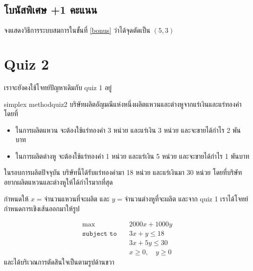 \subsection*{โบนัสพิเศษ +1 คะแนน}
จงแสดงวิธีการระบบสมการในขั้นที่ \ref{bonus} ว่าได้จุดตัดเป็น $(5,3)$

\newpage
\section*{Quiz 2}
เราจะยังคงใช้โจทย์ปัญหาเดิมกับ quiz 1 อยู่
\begin{exercise}{simplex method}{quiz2}
    บริษัทผลิตอัญมณีแห่งหนึ่งผลิตแหวนและต่างหูจากแร่เงินและแร่ทองคำ โดยที่
    \begin{itemize}
        \item ในการผลิตแหวน จะต้องใช้แร่ทองคำ 3 หน่วย และแร่เงิน 3 หน่วย และจะขายได้กำไร 2 พันบาท
        \item ในการผลิตต่างหู จะต้องใช้แร่ทองคำ 1 หน่วย และแร่เงิน 5 หน่วย และจะขายได้กำไร 1 พันบาท
    \end{itemize}
    ในรอบการผลิตปัจจุบัน บริษัทนี้ได้รับแร่ทองคำมา 18 หน่วย และแร่เงินมา 30 หน่วย โดยที่บริษัทอยากผลิตแหวนและต่างหูให้ได้กำไรมากที่สุด
\end{exercise}

กำหนดให้ $x = \text{จำนวนแหวนที่จะผลิต}$ และ $y = \text{จำนวนต่างหูที่จะผลิต}$ และจาก quiz 1 เราได้โจทย์กำหนดการเชิงเส้นออกมาให้รูป

\begin{multicols}{2}
    \begin{align*}
    \max \quad & 2000x + 1000y\\
    \texttt{subject to} \quad
    & 3x + y \leq 18 \\
    & 3x + 5y \leq 30 \\
    & x \geq 0, \quad y \geq 0 
\end{align*}
และได้บริเวณการตัดสินใจเป็นตามรูปด้านขวา
\end{multicols}

